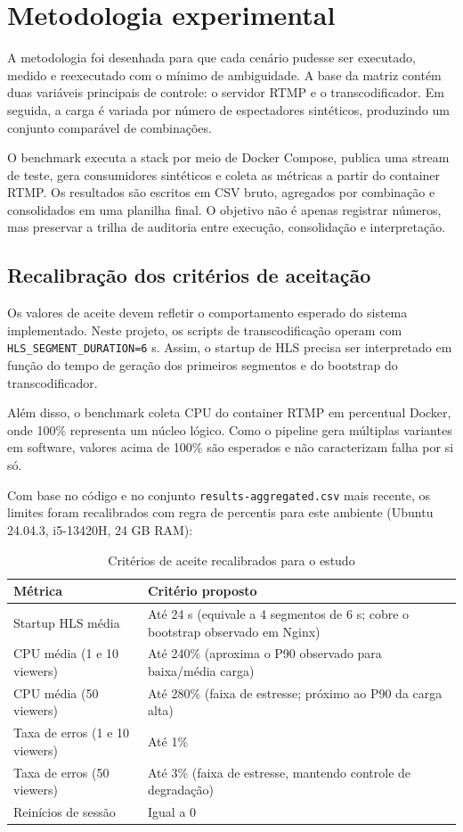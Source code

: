 \section{Metodologia experimental}

A metodologia foi desenhada para que cada cenário pudesse ser executado, medido e reexecutado com o mínimo de ambiguidade. A base da matriz contém duas variáveis principais de controle: o servidor RTMP e o transcodificador. Em seguida, a carga é variada por número de espectadores sintéticos, produzindo um conjunto comparável de combinações.

O benchmark executa a stack por meio de Docker Compose, publica uma stream de teste, gera consumidores sintéticos e coleta as métricas a partir do container RTMP. Os resultados são escritos em CSV bruto, agregados por combinação e consolidados em uma planilha final. O objetivo não é apenas registrar números, mas preservar a trilha de auditoria entre execução, consolidação e interpretação.

\subsection{Recalibração dos critérios de aceitação}

Os valores de aceite devem refletir o comportamento esperado do sistema implementado. Neste projeto, os scripts de transcodificação operam com \texttt{HLS\_SEGMENT\_DURATION=6} s. Assim, o startup de HLS precisa ser interpretado em função do tempo de geração dos primeiros segmentos e do bootstrap do transcodificador.

Além disso, o benchmark coleta CPU do container RTMP em percentual Docker, onde 100\% representa um núcleo lógico. Como o pipeline gera múltiplas variantes em software, valores acima de 100\% são esperados e não caracterizam falha por si só.

Com base no código e no conjunto \texttt{results-aggregated.csv} mais recente, os limites foram recalibrados com regra de percentis para este ambiente (Ubuntu 24.04.3, i5-13420H, 24 GB RAM):

\begin{table}[H]
\centering
\caption{Critérios de aceite recalibrados para o estudo}
\begin{tabularx}{\textwidth}{@{}lX@{}}
\toprule
\textbf{Métrica} & \textbf{Critério proposto} \\
\midrule
Startup HLS média & Até 24 s (equivale a 4 segmentos de 6 s; cobre o bootstrap observado em Nginx) \\
CPU média (1 e 10 viewers) & Até 240\% (aproxima o P90 observado para baixa/média carga) \\
CPU média (50 viewers) & Até 280\% (faixa de estresse; próximo ao P90 da carga alta) \\
Taxa de erros (1 e 10 viewers) & Até 1\% \\
Taxa de erros (50 viewers) & Até 3\% (faixa de estresse, mantendo controle de degradação) \\
Reinícios de sessão & Igual a 0 \\
\bottomrule
\end{tabularx}
\end{table}

